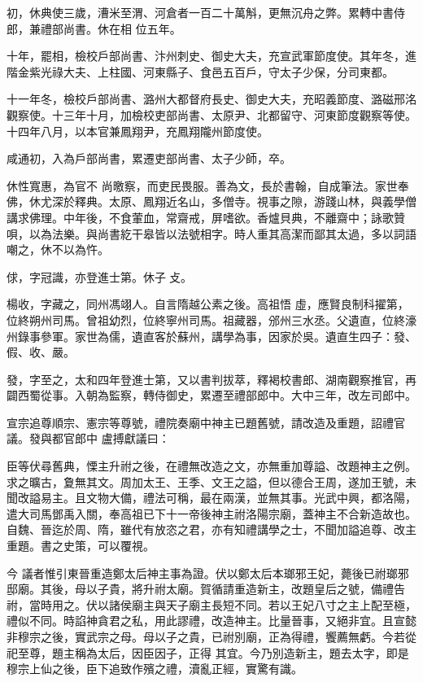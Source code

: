 \begin{pinyinscope}
 初，休典使三歲，漕米至渭、河倉者一百二十萬斛，更無沉舟之弊。累轉中書侍郎，兼禮部尚書。休在相
 位五年。



 十年，罷相，檢校戶部尚書、汴州刺史、御史大夫，充宣武軍節度使。其年冬，進階金紫光祿大夫、上柱國、河東縣子、食邑五百戶，守太子少保，分司東都。



 十一年冬，檢校戶部尚書、潞州大都督府長史、御史大夫，充昭義節度、潞磁邢洺觀察使。十三年十月，加檢校吏部尚書、太原尹、北都留守、河東節度觀察等使。十四年八月，以本官兼鳳翔尹，充鳳翔隴州節度使。



 咸通初，入為戶部尚書，累遷吏部尚書、太子少師，卒。



 休性寬惠，為官不
 尚曒察，而吏民畏服。善為文，長於書翰，自成筆法。家世奉佛，休尤深於釋典。太原、鳳翔近名山，多僧寺。視事之隙，游踐山林，與義學僧講求佛理。中年後，不食葷血，常齋戒，屏嗜欲。香爐貝典，不離齋中；詠歌贊唄，以為法樂。與尚書紇干皋皆以法號相字。時人重其高潔而鄙其太過，多以詞語嘲之，休不以為忤。



 俅，字冠識，亦登進士第。休子攴。



 楊收，字藏之，同州馮翊人。自言隋越公素之後。高祖悟
 虛，應賢良制科擢第，位終朔州司馬。曾祖幼烈，位終寧州司馬。祖藏器，邠州三水丞。父遺直，位終濠州錄事參軍。家世為儒，遺直客於蘇州，講學為事，因家於吳。遺直生四子：發、假、收、嚴。



 發，字至之，太和四年登進士第，又以書判拔萃，釋褐校書郎、湖南觀察推官，再闢西蜀從事。入朝為監察，轉侍御史，累遷至禮部郎中。大中三年，改左司郎中。



 宣宗追尊順宗、憲宗等尊號，禮院奏廟中神主已題舊號，請改造及重題，詔禮官議。發與都官郎中
 盧搏獻議曰：



 臣等伏尋舊典，慄主升祔之後，在禮無改造之文，亦無重加尊謚、改題神主之例。求之曠古，夐無其文。周加太王、王季、文王之謚，但以德合王周，遂加王號，未聞改謚易主。且文物大備，禮法可稱，最在兩漢，並無其事。光武中興，都洛陽，遣大司馬鄧禹入關，奉高祖已下十一帝後神主祔洛陽宗廟，蓋神主不合新造故也。自魏、晉迄於周、隋，雖代有放恣之君，亦有知禮講學之士，不聞加謚追尊、改主重題。書之史策，可以覆視。



 今
 議者惟引東晉重造鄭太后神主事為證。伏以鄭太后本瑯邪王妃，薨後已祔瑯邪邸廟。其後，母以子貴，將升祔太廟。賀循請重造新主，改題皇后之號，備禮告祔，當時用之。伏以諸侯廟主與天子廟主長短不同。若以王妃八寸之主上配至極，禮似不同。時諂神貪君之私，用此謬禮，改造神主。比量晉事，又絕非宜。且宣懿非穆宗之後，實武宗之母。母以子之貴，已祔別廟，正為得禮，饗薦無虧。今若從祀至尊，題主稱為太后，因臣因子，正得
 其宜。今乃別造新主，題去太字，即是穆宗上仙之後，臣下追致作殯之禮，瀆亂正經，實驚有識。




\end{pinyinscope}
